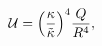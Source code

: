 \begin{equation}
{\mathcal{U}}={{\left({{\kappa}\over{\tilde{\kappa}}}\right)}^4}
{Q\over{R^4}},\label{KfB}
\end{equation}

